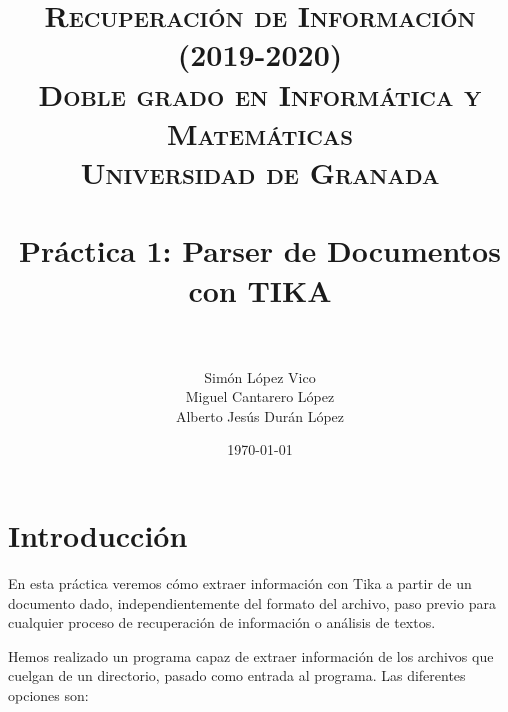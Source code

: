 

\title{	
	\normalfont \normalsize 
	\textsc{\textbf{Recuperación de Información (2019-2020)} \\ Doble grado en Informática y Matemáticas \\ Universidad de Granada} \\ [25pt] 
	\horrule{0.5pt} \\[0.4cm]
	\huge Práctica 1: Parser de Documentos con TIKA  \\ 
	\horrule{2pt} \\[0.5cm] 
}

\author{Simón López Vico \\ Miguel Cantarero López \\ Alberto Jesús Durán López} 
\date{\normalsize\today}



\maketitle       %
\newpage 
\tableofcontents %
\newpage

\section{Introducción}
En esta práctica veremos cómo extraer información con Tika a partir de un documento dado, independientemente del formato del archivo, paso previo para cualquier proceso de recuperación de información o análisis de textos.
	
Hemos realizado un programa capaz de extraer información de los archivos que cuelgan de un directorio, pasado como entrada al programa. Las diferentes opciones son:

